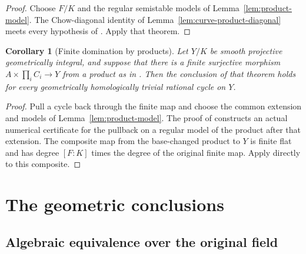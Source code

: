 \documentclass[11pt]{article}
\newtheorem{corollary}[theorem]{Corollary}
\theoremstyle{definition}
\theoremstyle{remark}
\numberwithin{equation}{section}
\begin{document}
\begin{proof}
Choose $F/K$ and the regular semistable models of
Lemma~\ref{lem:product-model}.  The Chow-diagonal identity of
Lemma~\ref{lem:curve-product-diagonal} meets every hypothesis of
.  Apply that theorem.
\end{proof}

\begin{corollary}[Finite domination by products]
\label{cor:finite-curve-product}
Let $Y/K$ be smooth projective geometrically integral, and
suppose that there is a finite surjective morphism
$A\times\prod_i C_i\to Y$ from a product as in
.  Then the conclusion of that
theorem holds for every geometrically homologically trivial
rational cycle on $Y$.
\end{corollary}

\begin{proof}
Pull a cycle back through the finite map and choose the common
extension and models of Lemma~\ref{lem:product-model}.  The proof
of  constructs an actual
numerical certificate for the pullback on a regular model of
the product after that extension.  The composite map from
the base-changed product to $Y$ is finite flat and has degree
$[F:K]$ times the degree of the original finite map.  Apply
 directly to this composite.
\end{proof}



\section{The geometric conclusions}\label{sec:conditional-conclusions}

\subsection{Algebraic equivalence over the original field}\label{sec:conditional-algebraic-proof}
\end{document}
